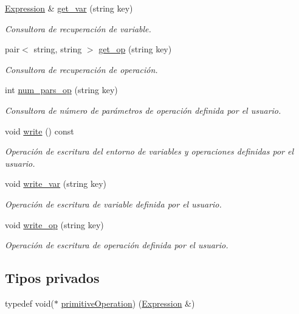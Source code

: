\begin{DoxyCompactItemize}
\hyperlink{class_expression}{Expression} \& \hyperlink{class_environment_a3f717bc3f94f76cfb8bc7ff139ffe89b}{get\+\_\+var} (string key)
\begin{DoxyCompactList}\small\item\em Consultora de recuperación de variable. \end{DoxyCompactList}\item 
pair$<$ string, string $>$ \hyperlink{class_environment_a4d1630588a2868e2a3ae3868087dedf2}{get\+\_\+op} (string key)
\begin{DoxyCompactList}\small\item\em Consultora de recuperación de operación. \end{DoxyCompactList}\item 
int \hyperlink{class_environment_a22ef2de52498e9f0a7491c85e2148f83}{num\+\_\+pars\+\_\+op} (string key)
\begin{DoxyCompactList}\small\item\em Consultora de número de parámetros de operación definida por el usuario. \end{DoxyCompactList}\item 
void \hyperlink{class_environment_ae219751d8017a3ca66b11b74fd45cf9c}{write} () const 
\begin{DoxyCompactList}\small\item\em Operación de escritura del entorno de variables y operaciones definidas por el usuario. \end{DoxyCompactList}\item 
void \hyperlink{class_environment_a2fda411113f72e6e86176b8f00fcc9d7}{write\+\_\+var} (string key)
\begin{DoxyCompactList}\small\item\em Operación de escritura de variable definida por el usuario. \end{DoxyCompactList}\item 
void \hyperlink{class_environment_a6f449052df64c7f8bf44428835dc3d7b}{write\+\_\+op} (string key)
\begin{DoxyCompactList}\small\item\em Operación de escritura de operación definida por el usuario. \end{DoxyCompactList}\end{DoxyCompactItemize}
\subsection*{Tipos privados}
\begin{DoxyCompactItemize}
\item 
typedef void($\ast$ \hyperlink{class_environment_a3d2dfb3b9d5843e64fd24e5a2008029d}{primitive\+Operation}) (\hyperlink{class_expression}{Expression} \&)
\end{DoxyCompactItemize}
